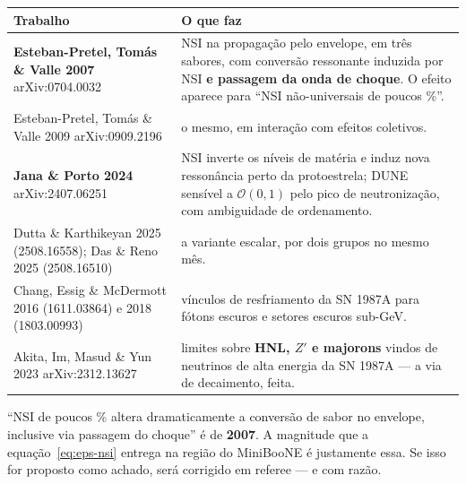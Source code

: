 \begin{center}
\begin{tabular}{@{}>{\small}p{6.5cm} >{\small}p{6.0cm}@{}}
\toprule
\small\bfseries Trabalho & \small\bfseries O que faz \\
\midrule
\textbf{Esteban-Pretel, Tomás \& Valle 2007} \newline arXiv:0704.0032
  & NSI na propagação pelo envelope, em três sabores, com conversão ressonante
    induzida por NSI \textbf{e passagem da onda de choque}. O efeito aparece
    para ``NSI não-universais de poucos \%''. \\
Esteban-Pretel, Tomás \& Valle 2009 \newline arXiv:0909.2196
  & o mesmo, em interação com efeitos coletivos. \\
\textbf{Jana \& Porto 2024} \newline arXiv:2407.06251
  & NSI inverte os níveis de matéria e induz nova ressonância perto da
    protoestrela; DUNE sensível a $\mathcal{O}(0{,}1)$ pelo pico de
    neutronização, com ambiguidade de ordenamento. \\
Dutta \& Karthikeyan 2025 (2508.16558); Das \& Reno 2025 (2508.16510)
  & a variante escalar, por dois grupos no mesmo mês. \\
Chang, Essig \& McDermott 2016 (1611.03864) e 2018 (1803.00993)
  & vínculos de resfriamento da SN 1987A para fótons escuros e setores escuros
    sub-GeV. \\
Akita, Im, Masud \& Yun 2023 \newline arXiv:2312.13627
  & limites sobre \textbf{HNL, $Z'$ e majorons} vindos de neutrinos de alta
    energia da SN 1987A --- a via de decaimento, feita. \\
\bottomrule
\end{tabular}
\end{center}

\begin{alerta}
``NSI de poucos \% altera dramaticamente a conversão de sabor no envelope,
inclusive via passagem do choque'' é de \textbf{2007}. A magnitude que a
equação~\eqref{eq:eps-nsi} entrega na região do MiniBooNE é justamente essa. Se
isso for proposto como achado, será corrigido em referee --- e com razão.
\end{alerta}


